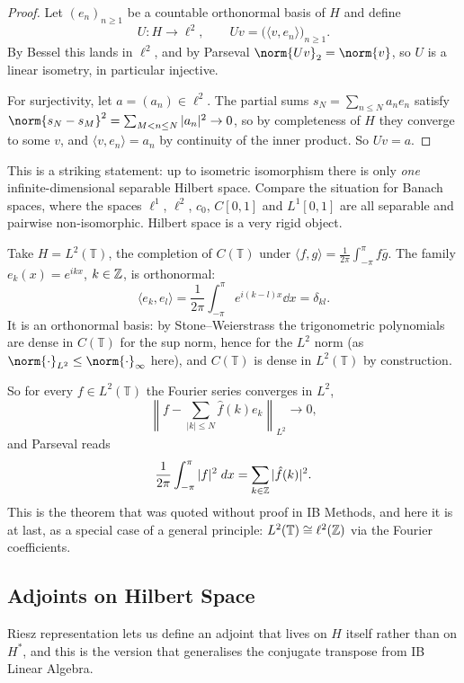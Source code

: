 \documentclass[a4paper]{scrartcl}
\newcommand{\ip}[2]{\langle #1, #2 \rangle}
\begin{document}
\begin{proof}
	Let $(e_n)_{n\geq1}$ be a countable orthonormal basis of $H$ and define
	$$U : H \to \ell^2, \qquad Uv = \big(\ip{v}{e_n}\big)_{n\geq1}.$$
	By Bessel this lands in $\ell^2$, and by Parseval $\norm{Uv}_2 = \norm{v}$, so $U$ is a linear isometry, in particular injective.

	For surjectivity, let $a = (a_n)\in\ell^2$. The partial sums $s_N = \sum_{n\leq N}a_ne_n$ satisfy $\norm{s_N-s_M}^2 = \sum_{M<n\leq N}|a_n|^2 \to 0$, so by completeness of $H$ they converge to some $v$, and $\ip{v}{e_n} = a_n$ by continuity of the inner product. So $Uv = a$.
\end{proof}

This is a striking statement: up to isometric isomorphism there is only \emph{one} infinite-dimensional separable Hilbert space. Compare the situation for Banach spaces, where the spaces $\ell^1$, $\ell^2$, $c_0$, $C[0,1]$ and $L^1[0,1]$ are all separable and pairwise non-isomorphic. Hilbert space is a very rigid object.

\begin{example}
	Take $H = L^2(\mathbb{T})$, the completion of $C(\mathbb{T})$ under $\ip{f}{g}=\frac{1}{2\pi}\int_{-\pi}^\pi f\bar g$. The family $e_k(x) = e^{ikx}$, $k \in \mathbb{Z}$, is orthonormal:
	$$\ip{e_k}{e_l} = \frac{1}{2\pi}\int_{-\pi}^{\pi}e^{i(k-l)x}\dd x = \delta_{kl}.$$
	It is an orthonormal basis: by Stone--Weierstrass the trigonometric polynomials are dense in $C(\mathbb{T})$ for the sup norm, hence for the $L^2$ norm (as $\norm{\cdot}_{L^2}\leq\norm{\cdot}_\infty$ here), and $C(\mathbb{T})$ is dense in $L^2(\mathbb{T})$ by construction.

	So for every $f \in L^2(\mathbb{T})$ the Fourier series converges in $L^2$,
	$$\left\| f - \sum_{|k|\leq N} \hat f(k)e_k \right\|_{L^2} \longrightarrow 0,$$
	and Parseval reads
	$$\frac{1}{2\pi}\int_{-\pi}^\pi |f|^2 \; d x = \sum_{k \in \mathbb{Z}}|\hat f(k)|^2.$$
	This is the theorem that was quoted without proof in IB Methods, and here it is at last, as a special case of a general principle: $L^2(\mathbb{T}) \cong \ell^2(\mathbb{Z})$ via the Fourier coefficients.
\end{example}

\subsection{Adjoints on Hilbert Space}

Riesz representation lets us define an adjoint that lives on $H$ itself rather than on $H^*$, and this is the version that generalises the conjugate transpose from IB Linear Algebra.
\end{document}

